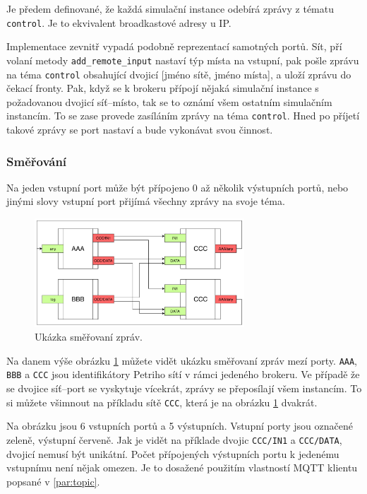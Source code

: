 Je předem definované, že každá simulační instance odebírá zprávy z tématu \texttt{control}. Je to ekvivalent broadkastové adresy u IP.

Implementace zevnitř vypadá podobně reprezentací samotných portů. Sít, pří volaní metody \texttt{add\_remote\_input} nastaví týp místa na vstupní, pak pošle zprávu na téma \texttt{control} obsahující dvojicí [jméno sítě, jméno místa], a uloží zprávu do čekací fronty. Pak, když se k brokeru přípojí nějaká simulační instance s požadovanou dvojicí síť--místo, tak se to oznámí všem ostatním simulačním instancím. To se zase provede zasíláním zprávy na téma \texttt{control}. Hned po příjetí takové zprávy se port nastaví a bude vykonávat svou činnost.

\subsubsection{Směřování}
Na jeden vstupní port může být přípojeno 0 až několik výstupních portů, nebo jinými slovy vstupní port přijímá všechny zprávy na svoje téma.

\begin{figure}[htb]
  \centering
  \includegraphics[width=0.7\textwidth]{obrazky-figures/Port-routing.pdf}
  \caption{Ukázka směřovaní zpráv.}
  \label{route-viz}
\end{figure}

Na danem výše obrázku \ref{route-viz} můžete vidět ukázku směřovaní zpráv mezí porty. \texttt{AAA}, \texttt{BBB} a \texttt{CCC} jsou identifikátory Petriho sítí v rámci jedeného brokeru. Ve případě že se dvojice síť--port se vyskytuje vícekrát, zprávy se přeposílají všem instancím. To si můžete všimnout na příkladu sítě \texttt{CCC}, která je na obrázku \ref{route-viz} dvakrát.

Na obrázku jsou 6 vstupních portů a 5 výstupních. Vstupní porty jsou označené zeleně, výstupní červeně. Jak je vidět na příklade dvojic \texttt{CCC/IN1} a \texttt{CCC/DATA}, dvojicí nemusí být unikátní. Počet přípojených výstupních portu k jedenému vstupnímu není nějak omezen. Je to dosažené použitím vlastností MQTT klientu popsané v \ref{par:topic}.


